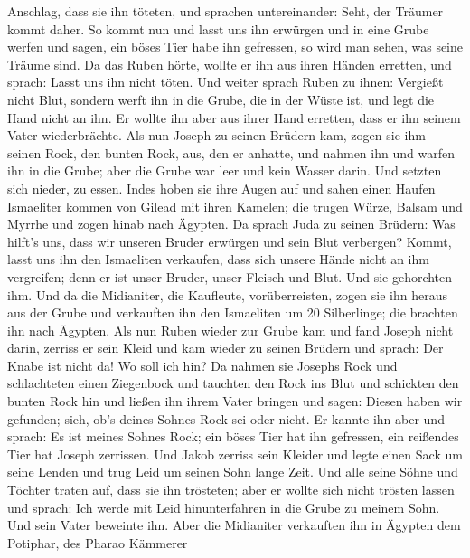 Anschlag, dass sie ihn töteten,  und sprachen
untereinander: Seht, der Träumer kommt daher.  So kommt nun
und lasst uns ihn erwürgen und in eine Grube werfen und sagen, ein böses
Tier habe ihn gefressen, so wird man sehen, was seine Träume sind.
 Da das Ruben hörte, wollte er ihn aus ihren Händen
erretten, und sprach: Lasst uns ihn nicht töten.  Und
weiter sprach Ruben zu ihnen: Vergießt nicht Blut, sondern werft ihn in
die Grube, die in der Wüste ist, und legt die Hand nicht an ihn. Er
wollte ihn aber aus ihrer Hand erretten, dass er ihn seinem Vater
wiederbrächte.  Als nun Joseph zu seinen Brüdern kam, zogen
sie ihm seinen Rock, den bunten Rock, aus, den er anhatte, 
und nahmen ihn und warfen ihn in die Grube; aber die Grube war leer und
kein Wasser darin.  Und setzten sich nieder, zu essen.
Indes hoben sie ihre Augen auf und sahen einen Haufen Ismaeliter kommen
von Gilead mit ihren Kamelen; die trugen Würze, Balsam und Myrrhe und
zogen hinab nach Ägypten.  Da sprach Juda zu seinen
Brüdern: Was hilft's uns, dass wir unseren Bruder erwürgen und sein Blut
verbergen?  Kommt, lasst uns ihn den Ismaeliten verkaufen,
dass sich unsere Hände nicht an ihm vergreifen; denn er ist unser
Bruder, unser Fleisch und Blut. Und sie gehorchten ihm. 
Und da die Midianiter, die Kaufleute, vorüberreisten, zogen sie ihn
heraus aus der Grube und verkauften ihn den Ismaeliten um 20
Silberlinge; die brachten ihn nach Ägypten.  Als nun Ruben
wieder zur Grube kam und fand Joseph nicht darin, zerriss er sein Kleid
 und kam wieder zu seinen Brüdern und sprach: Der Knabe ist
nicht da! Wo soll ich hin?  Da nahmen sie Josephs Rock und
schlachteten einen Ziegenbock und tauchten den Rock ins Blut
 und schickten den bunten Rock hin und ließen ihn ihrem
Vater bringen und sagen: Diesen haben wir gefunden; sieh, ob's deines
Sohnes Rock sei oder nicht.  Er kannte ihn aber und sprach:
Es ist meines Sohnes Rock; ein böses Tier hat ihn gefressen, ein
reißendes Tier hat Joseph zerrissen.  Und Jakob zerriss
sein Kleider und legte einen Sack um seine Lenden und trug Leid um
seinen Sohn lange Zeit.  Und alle seine Söhne und Töchter
traten auf, dass sie ihn trösteten; aber er wollte sich nicht trösten
lassen und sprach: Ich werde mit Leid hinunterfahren in die Grube zu
meinem Sohn. Und sein Vater beweinte ihn.  Aber die
Midianiter verkauften ihn in Ägypten dem Potiphar, des Pharao Kämmerer
